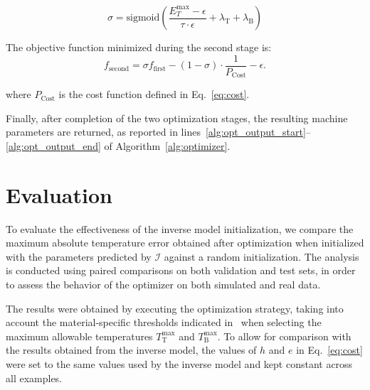 \begin{equation}
	\sigma = \text{sigmoid} \left( \frac{E_T^{\text{max}} - \epsilon}{\tau \cdot \epsilon} + \lambda_\text{T} + \lambda_\text{B} \right)
	\label{eq:tradeoff_sigmoid}
\end{equation}

The objective function minimized during the second stage is:
\begin{equation}
	f_{\text{second}} = \sigma f_{\text{first}} - (1 - \sigma) \cdot \frac{1}{P_{\text{Cost}}} - \epsilon.
	\label{eq:f_second}
\end{equation}

\noindent where $P_{\text{Cost}}$ is the cost function defined in Eq.~\ref{eq:cost}.

Finally, after completion of the two optimization stages, the resulting machine parameters are returned, as reported in lines~\ref{alg:opt_output_start}--\ref{alg:opt_output_end} of Algorithm~\ref{alg:optimizer}. 



\section{Evaluation}

To evaluate the effectiveness of the inverse model initialization, we compare the maximum absolute temperature error obtained after optimization when initialized with the parameters predicted by $\mathcal{I}$ against a random initialization. The analysis is conducted using paired comparisons on both validation and test sets, in order to assess the behavior of the optimizer on both simulated and real data.

The results were obtained by executing the optimization strategy, taking into account the material-specific thresholds indicated in~\cite{schwarzmann2018thermoforming} when selecting the maximum allowable temperatures $T_\text{T}^{\max}$ and $T_\text{B}^{\max}$. To allow for comparison with the results obtained from the inverse model, the values of $h$ and $e$ in Eq.~\ref{eq:cost} were set to the same values used by the inverse model and kept constant across all examples.


